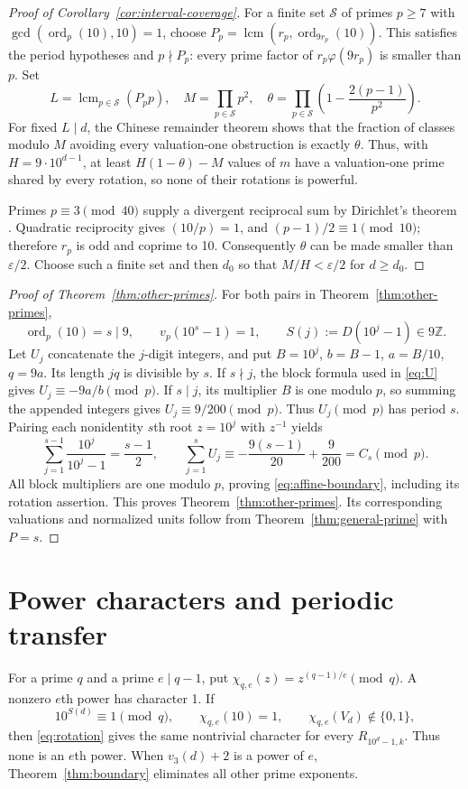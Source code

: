 \documentclass[10pt]{article}
\newcommand{\Z}{\mathbb Z}
\begin{document}
\begin{proof}[Proof of Corollary~\ref{cor:interval-coverage}]
For a finite set $\mathcal S$ of primes $p\ge7$ with
$\gcd(\operatorname{ord}_p(10),10)=1$, choose
$P_p=\operatorname{lcm}(r_p,\operatorname{ord}_{9r_p}(10))$.
This satisfies the period hypotheses and $p\nmid P_p$:
every prime factor of $r_p\varphi(9r_p)$ is smaller than $p$.
Set
\[
 L=\operatorname{lcm}_{p\in\mathcal S}(P_pp),\quad
 M=\prod_{p\in\mathcal S}p^2,\quad
 \theta=\prod_{p\in\mathcal S}\left(1-\frac{2(p-1)}{p^2}\right).
\]
For fixed $L\mid d$, the Chinese remainder theorem shows that the fraction
of classes modulo $M$ avoiding every valuation-one obstruction is exactly
$\theta$. Thus, with $H=9\cdot10^{d-1}$, at least
$H(1-\theta)-M$ values of $m$ have a valuation-one prime shared by every
rotation, so none of their rotations is powerful.

Primes $p\equiv3\pmod{40}$ supply a divergent reciprocal sum by
Dirichlet's theorem \cite{dirichlet}. Quadratic reciprocity gives
$(10/p)=1$, and $(p-1)/2\equiv1\pmod{10}$; therefore $r_p$ is odd
and coprime to 10. Consequently $\theta$ can be made smaller than
$\varepsilon/2$. Choose such a finite set and then $d_0$ so that
$M/H<\varepsilon/2$ for $d\ge d_0$.
\end{proof}

\begin{proof}[Proof of Theorem~\ref{thm:other-primes}]
For both pairs in Theorem~\ref{thm:other-primes},
\[
 \operatorname{ord}_p(10)=s\mid9,\qquad v_p(10^s-1)=1,
 \qquad S(j):=D(10^j-1)\in9\Z.
\]
Let $U_j$ concatenate the $j$-digit integers, and put
$B=10^j$, $b=B-1$, $a=B/10$, $q=9a$. Its length $jq$ is divisible by $s$.
If $s\nmid j$, the block formula used in \eqref{eq:U} gives
$U_j\equiv-9a/b\pmod p$. If $s\mid j$, its multiplier $B$ is one modulo $p$,
so summing the appended integers gives $U_j\equiv9/200\pmod p$.
Thus $U_j\pmod p$ has period $s$. Pairing each nonidentity $s$th root
$z=10^j$ with $z^{-1}$ yields
\[
 \sum_{j=1}^{s-1}\frac{10^j}{10^j-1}=\frac{s-1}{2},\qquad
 \sum_{j=1}^s U_j\equiv-\frac{9(s-1)}{20}+\frac9{200}=C_s\pmod p.
\]
All block multipliers are one modulo $p$, proving
\eqref{eq:affine-boundary}, including its rotation assertion.
This proves Theorem~\ref{thm:other-primes}. Its corresponding valuations and
normalized units follow from Theorem~\ref{thm:general-prime} with $P=s$.

\end{proof}

\section{Power characters and periodic transfer}\label{sec:characters}
For a prime $q$ and a prime $e\mid q-1$, put
$\chi_{q,e}(z)=z^{(q-1)/e}\pmod q$. A nonzero $e$th power has character 1.
If
\begin{equation}\label{eq:character}
 10^{S(d)}\equiv1\pmod q,\qquad
 \chi_{q,e}(10)=1,\qquad
 \chi_{q,e}(V_d)\notin\{0,1\},
\end{equation}
then \eqref{eq:rotation} gives the same nontrivial character for every
$R_{10^d-1,k}$. Thus none is an $e$th power. When $v_3(d)+2$ is a power
of $e$, Theorem~\ref{thm:boundary} eliminates all other prime exponents.
\end{document}
